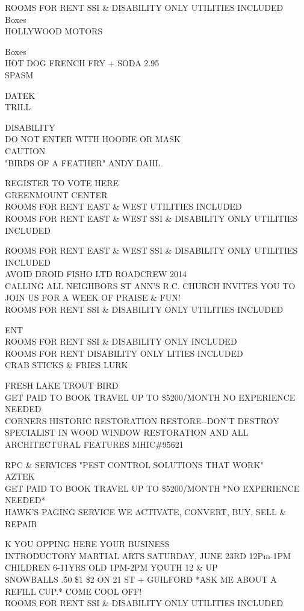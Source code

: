 \documentclass[10pt,letterpaper]{article}
\begin{document}
ROOMS FOR RENT SSI \& DISABILITY ONLY UTILITIES INCLUDED\\
Boxes\\
HOLLYWOOD MOTORS

Boxes\\
HOT DOG FRENCH FRY + SODA 2.95\\
SPASM

DATEK\\
TRILL

DISABILITY\\
DO NOT ENTER WITH HOODIE OR MASK\\
CAUTION\\
"BIRDS OF A FEATHER" ANDY DAHL

REGISTER TO VOTE HERE\\
GREENMOUNT CENTER\\
ROOMS FOR RENT EAST \& WEST UTILITIES INCLUDED\\
ROOMS FOR RENT EAST \& WEST SSI \& DISABILITY ONLY UTILITIES INCLUDED

ROOMS FOR RENT EAST \& WEST SSI \& DISABILITY ONLY UTILITIES INCLUDED\\
AVOID DROID FISHO LTD ROADCREW 2014\\
CALLING ALL NEIGHBORS ST ANN'S R.C. CHURCH INVITES YOU TO JOIN US FOR A WEEK OF PRAISE \& FUN!\\
ROOMS FOR RENT SSI \& DISABILITY ONLY UTILITIES INCLUDED

ENT\\
ROOMS FOR RENT SSI \& DISABILITY ONLY INCLUDED\\
ROOMS FOR RENT DISABILITY ONLY LITIES INCLUDED\\
CRAB STICKS \& FRIES LURK

FRESH LAKE TROUT BIRD\\
GET PAID TO BOOK TRAVEL UP TO \$5200/MONTH NO EXPERIENCE NEEDED\\
CORNERS HISTORIC RESTORATION RESTORE{-}{-}DON'T DESTROY SPECIALIST IN WOOD WINDOW RESTORATION AND ALL ARCHITECTURAL FEATURES MHIC\#95621

RPC \& SERVICES "PEST CONTROL SOLUTIONS THAT WORK"\\
AZTEK\\
GET PAID TO BOOK TRAVEL UP TO \$5200/MONTH *NO EXPERIENCE NEEDED*\\
HAWK'S PAGING SERVICE WE ACTIVATE, CONVERT, BUY, SELL \& REPAIR

K YOU OPPING HERE YOUR BUSINESS\\
INTRODUCTORY MARTIAL ARTS SATURDAY, JUNE 23RD 12Pm{-}1PM CHILDREN 6{-}11YRS OLD 1PM{-}2PM YOUTH 12 \& UP\\
SNOWBALLS .50 \$1 \$2 ON 21 ST + GUILFORD *ASK ME ABOUT A REFILL CUP.* COME COOL OFF!\\
ROOMS FOR RENT SSI \& DISABILITY ONLY UTILITIES INCLUDED
\end{document}
